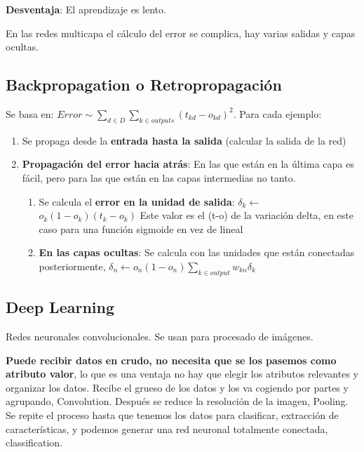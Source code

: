 \documentclass[12pt, twoside, openright]{report} %
\begin{document}
\textbf{Desventaja}: El aprendizaje es lento.

En las redes multicapa el cálculo del error se complica, hay varias
salidas y capas ocultas.

\subsection{Backpropagation o Retropropagación}

Se basa en:
$Error \sim \sum _{d \in D} \sum_{k \in outputs} (t_{kd}-o_{kd})^2$.
Para cada ejemplo:

\begin{enumerate}
\def\labelenumi{\arabic{enumi}.}

\item
  Se propaga desde la \textbf{entrada hasta la salida} (calcular la salida de la red)
\item
  \textbf{Propagación del error hacia atrás}: En las que están en la
  última capa es fácil, pero para las que están en las capas intermedias
  no tanto.

  \begin{enumerate}
  \def\labelenumii{\arabic{enumii}.}
  
  \item
    Se calcula el \textbf{error en la unidad de salida}:
    \(\delta_k \leftarrow\) \(o_k(1-o_k)(t_k-o_k)\) Este valor es el
    (t-o) de la variación delta, en este caso para una función sigmoide
    en vez de lineal
  \item
    \textbf{En las capas ocultas}: Se calcula con las unidades que están
    conectadas posteriormente,
    \(\delta_n \leftarrow o_n(1-o_n)\sum_{k \in output} w_{kn}\delta_k\)
  \end{enumerate}
\end{enumerate}

\subsection{Deep Learning}

Redes neuronales convolucionales. Se usan para procesado de imágenes.

\textbf{Puede recibir datos en crudo, no necesita que se los pasemos
como atributo valor}, lo que es una ventaja no hay que elegir los atributos
relevantes y organizar los datos. Recibe el grueso de los datos y los
va cogiendo por partes y agrupando, Convolution. Después se reduce la
resolución de la imagen, Pooling. Se repite el proceso hasta que tenemos
los datos para clasificar, extracción de características, y podemos
generar una red neuronal totalmente conectada, classification.
\end{document}
